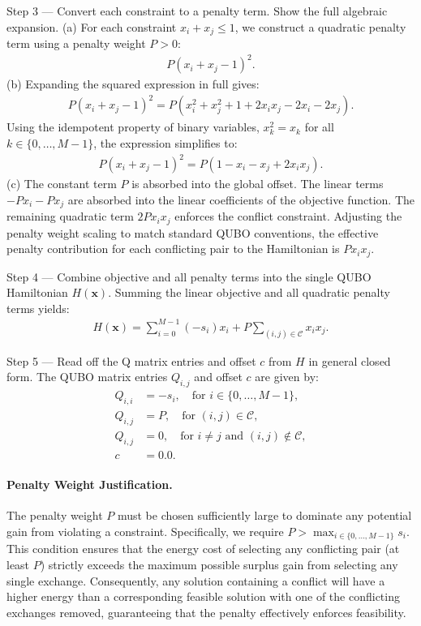 \documentclass[12pt]{article}
\begin{document}
Step 3 --- Convert each constraint to a penalty term. Show the full algebraic expansion.
(a) For each constraint $x_i + x_j \le 1$, we construct a quadratic penalty term using a penalty weight $P > 0$:
\begin{align}
P(x_i + x_j - 1)^2.
\end{align}
(b) Expanding the squared expression in full gives:
\begin{align}
P(x_i + x_j - 1)^2 = P(x_i^2 + x_j^2 + 1 + 2x_i x_j - 2x_i - 2x_j).
\end{align}
Using the idempotent property of binary variables, $x_k^2 = x_k$ for all $k \in \{0, \dots, M-1\}$, the expression simplifies to:
\begin{align}
P(x_i + x_j - 1)^2 = P(1 - x_i - x_j + 2x_i x_j).
\end{align}
(c) The constant term $P$ is absorbed into the global offset. The linear terms $-P x_i - P x_j$ are absorbed into the linear coefficients of the objective function. The remaining quadratic term $2P x_i x_j$ enforces the conflict constraint. Adjusting the penalty weight scaling to match standard QUBO conventions, the effective penalty contribution for each conflicting pair to the Hamiltonian is $P x_i x_j$.

Step 4 --- Combine objective and all penalty terms into the single QUBO Hamiltonian $H(\mathbf{x})$.
Summing the linear objective and all quadratic penalty terms yields:
\begin{align}
H(\mathbf{x}) = \sum_{i=0}^{M-1} (-s_i) x_i + P \sum_{(i,j) \in \mathcal{C}} x_i x_j.
\end{align}

Step 5 --- Read off the Q matrix entries and offset $c$ from $H$ in general closed form.
The QUBO matrix entries $Q_{i,j}$ and offset $c$ are given by:
\begin{align}
Q_{i,i} &= -s_i, \quad \text{for } i \in \{0, \dots, M-1\}, \\
Q_{i,j} &= P, \quad \text{for } (i,j) \in \mathcal{C}, \\
Q_{i,j} &= 0, \quad \text{for } i \neq j \text{ and } (i,j) \notin \mathcal{C}, \\
c &= 0.0.
\end{align}

\paragraph{Penalty Weight Justification.}
The penalty weight $P$ must be chosen sufficiently large to dominate any potential gain from violating a constraint. Specifically, we require $P > \max_{i \in \{0,\dots,M-1\}} s_i$. This condition ensures that the energy cost of selecting any conflicting pair (at least $P$) strictly exceeds the maximum possible surplus gain from selecting any single exchange. Consequently, any solution containing a conflict will have a higher energy than a corresponding feasible solution with one of the conflicting exchanges removed, guaranteeing that the penalty effectively enforces feasibility.
\end{document}
